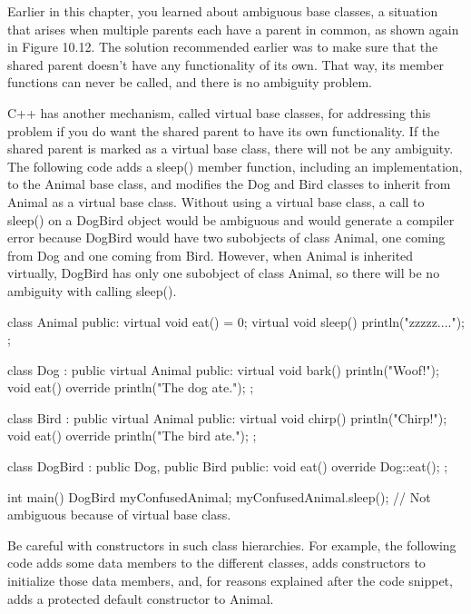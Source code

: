 
Earlier in this chapter, you learned about ambiguous base classes, a situation that arises when multiple parents each have a parent in common, as shown again in Figure 10.12. The solution recommended earlier was to make sure that the shared parent doesn’t have any functionality of its own. That way, its member functions can never be called, and there is no ambiguity problem.


C++ has another mechanism, called virtual base classes, for addressing this problem if you do want the shared parent to have its own functionality. If the shared parent is marked as a virtual base class, there will not be any ambiguity. The following code adds a sleep() member function, including an implementation, to the Animal base class, and modifies the Dog and Bird classes to inherit from Animal as a virtual base class. Without using a virtual base class, a call to sleep() on a DogBird object would be ambiguous and would generate a compiler error because DogBird would have two subobjects of class Animal, one coming from Dog and one coming from Bird. However, when Animal is inherited virtually, DogBird has only one subobject of class Animal, so there will be no ambiguity with calling sleep().

\begin{cpp}
class Animal
{
    public:
        virtual void eat() = 0;
        virtual void sleep() { println("zzzzz...."); }
};

class Dog : public virtual Animal
{
    public:
        virtual void bark() { println("Woof!"); }
        void eat() override { println("The dog ate."); }
};

class Bird : public virtual Animal
{
    public:
        virtual void chirp() { println("Chirp!"); }
        void eat() override { println("The bird ate."); }
};

class DogBird : public Dog, public Bird
{
    public:
        void eat() override { Dog::eat(); }
};

int main()
{
    DogBird myConfusedAnimal;
    myConfusedAnimal.sleep(); // Not ambiguous because of virtual base class.
}
\end{cpp}

Be careful with constructors in such class hierarchies. For example, the following code adds some data members to the different classes, adds constructors to initialize those data members, and, for reasons explained after the code snippet, adds a protected default constructor to Animal.

